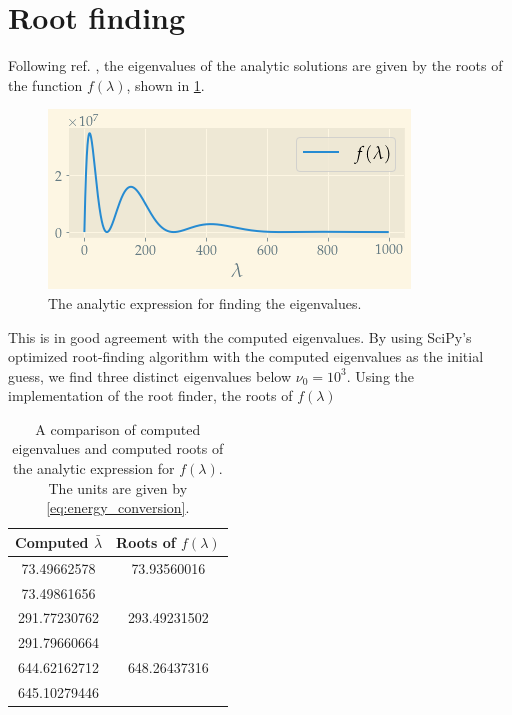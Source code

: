\section{Root finding}

Following ref. \cite{assignment}, the eigenvalues of the analytic solutions are given by the roots of the function $f(\lambda)$, shown in \cref{fig:f}. 
\begin{figure}
	\centering
	\includegraphics[width=\linewidth]{img/f}
	\caption{The analytic expression for finding the eigenvalues. }
	\label{fig:f}
\end{figure}
This is in good agreement with the computed eigenvalues. By using SciPy's \cite{2020SciPy-NMeth} optimized root-finding algorithm with the computed eigenvalues as the initial guess, we find three distinct eigenvalues below $\nu_0 = 10^3$.
Using the implementation of the root finder, the roots of $f(\lambda)$

\begin{table}
	\centering
\begin{tabular}{|c|c|}
	\hline
Computed $\bar\lambda$ & Roots of $f(\lambda) $\\
	\hline 
	73.49662578 & 73.93560016 \\ 

	73.49861656 &  \\ 

	291.77230762 & 293.49231502 \\ 
 
	291.79660664 &  \\ 
 
	644.62162712 & 648.26437316 \\ 

	645.10279446 &  \\
	\hline
\end{tabular}
	\caption{A comparison of computed eigenvalues and computed roots of the analytic expression for $f(\lambda)$. The units are given by \cref{eq:energy_conversion}. }
\end{table}